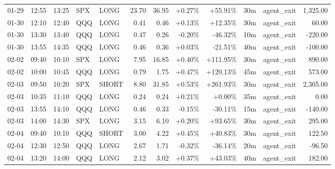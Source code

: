 \documentclass[11pt,a4paper,twoside]{article}
\begin{document}
\begin{center}
\begin{longtable}{>{\color{txtmain}}l l l l l r r r r r >{\color{txtmain}}l r}
01-29 & 12:55 & 13:25 & SPX & LONG & 23.70 & 36.95 & \textcolor{wingreen}{+0.27\%} & \textcolor{wingreen}{+55.91\%} & 30m & agent\_exit & \textcolor{wingreen}{1,325.00} \\
01-30 & 12:10 & 12:40 & QQQ & LONG & 0.41 & 0.46 & \textcolor{wingreen}{+0.13\%} & \textcolor{wingreen}{+12.35\%} & 30m & agent\_exit & \textcolor{wingreen}{60.00} \\
01-30 & 13:30 & 13:40 & QQQ & LONG & 0.47 & 0.26 & \textcolor{lossred}{-0.20\%} & \textcolor{lossred}{-46.32\%} & 10m & agent\_exit & \textcolor{lossred}{-220.00} \\
01-30 & 13:55 & 14:35 & QQQ & LONG & 0.46 & 0.36 & \textcolor{wingreen}{+0.03\%} & \textcolor{lossred}{-21.51\%} & 40m & agent\_exit & \textcolor{lossred}{-100.00} \\
02-02 & 09:40 & 10:10 & SPX & LONG & 7.95 & 16.85 & \textcolor{wingreen}{+0.40\%} & \textcolor{wingreen}{+111.95\%} & 30m & agent\_exit & \textcolor{wingreen}{890.00} \\
02-02 & 10:00 & 10:45 & QQQ & LONG & 0.79 & 1.75 & \textcolor{wingreen}{+0.47\%} & \textcolor{wingreen}{+120.13\%} & 45m & agent\_exit & \textcolor{wingreen}{573.00} \\
02-03 & 09:50 & 10:20 & SPX & SHORT & 8.80 & 31.85 & \textcolor{wingreen}{+0.53\%} & \textcolor{wingreen}{+261.93\%} & 30m & agent\_exit & \textcolor{wingreen}{2,305.00} \\
02-03 & 10:35 & 11:10 & QQQ & LONG & 0.24 & 0.24 & \textcolor{wingreen}{+0.21\%} & \textcolor{wingreen}{+0.00\%} & 35m & agent\_exit & \textcolor{wingreen}{0.00} \\
02-03 & 13:55 & 14:10 & QQQ & LONG & 0.46 & 0.33 & \textcolor{lossred}{-0.15\%} & \textcolor{lossred}{-30.11\%} & 15m & agent\_exit & \textcolor{lossred}{-140.00} \\
02-03 & 14:00 & 14:30 & SPX & LONG & 3.15 & 6.10 & \textcolor{wingreen}{+0.20\%} & \textcolor{wingreen}{+93.65\%} & 30m & agent\_exit & \textcolor{wingreen}{295.00} \\
02-04 & 09:40 & 10:10 & QQQ & SHORT & 3.00 & 4.22 & \textcolor{wingreen}{+0.45\%} & \textcolor{wingreen}{+40.83\%} & 30m & agent\_exit & \textcolor{wingreen}{122.50} \\
02-04 & 12:30 & 12:50 & QQQ & LONG & 2.67 & 1.71 & \textcolor{lossred}{-0.32\%} & \textcolor{lossred}{-36.14\%} & 20m & agent\_exit & \textcolor{lossred}{-96.50} \\
02-04 & 13:20 & 14:00 & QQQ & LONG & 2.12 & 3.02 & \textcolor{wingreen}{+0.37\%} & \textcolor{wingreen}{+43.03\%} & 40m & agent\_exit & \textcolor{wingreen}{182.00} \\

\end{longtable}
\end{center}
\end{document}
